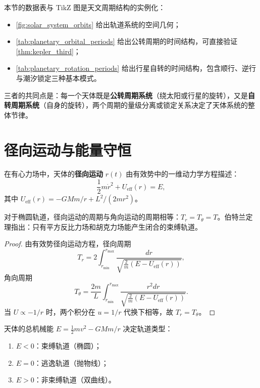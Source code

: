\begin{remark}[本节数据的组织方式]\label{rem:astro_data_organisation}
本节的数据表与 TikZ 图是天文周期结构的实例化：
\begin{itemize}
    \item \cref{fig:solar_system_orbits} 给出轨道系统的空间几何；
    \item \cref{tab:planetary_orbital_periods} 给出公转周期的时间结构，可直接验证 \cref{thm:kepler_third}；
    \item \cref{tab:planetary_rotation_periods} 给出行星自转的时间结构，包含顺行、逆行与潮汐锁定三种基本模式。
\end{itemize}
三者的共同点是：每一个天体既是\textbf{公转周期系统}（绕太阳或行星的旋转），又是\textbf{自转周期系统}（自身的旋转），两个周期的量级分离或锁定关系决定了天体系统的整体节律。
\end{remark}

\section{径向运动与能量守恒}

\begin{definition}[径向运动]\label{def:radial_motion}
在有心力场中，天体的\textbf{径向运动} \(r(t)\) 由有效势中的一维动力学方程描述：
\[
\frac12m\dot r^2+U_{\text{eff}}(r)=E,
\]
其中 \(U_{\text{eff}}(r)=-GMm/r+L^2/(2mr^2)\)。
\end{definition}

\begin{proposition}[径向振荡的周期]\label{prop:radial_oscillation_period}
对于椭圆轨道，径向运动的周期与角向运动的周期相等：\(T_r=T_\theta=T\)。伯特兰定理指出：只有平方反比力场和胡克力场能产生闭合的束缚轨道。
\end{proposition}

\begin{proof}
由有效势径向运动方程，径向周期
\[
T_r=2\int_{r_{\min}}^{r_{\max}}\frac{dr}{\sqrt{\frac2m(E-U_{\text{eff}}(r))}},
\]
角向周期
\[
T_\theta=\frac{2m}{L}\int_{r_{\min}}^{r_{\max}}\frac{r^2dr}{\sqrt{\frac2m(E-U_{\text{eff}}(r))}}.
\]
当 \(U\propto-1/r\) 时，两个积分在 \(u=1/r\) 代换下相等，故 \(T_r=T_\theta\)。
\end{proof}

\begin{proposition}[能量守恒与轨道类型]\label{prop:energy_orbital_type}
天体的总机械能 \(E=\frac12mv^2-GMm/r\) 决定轨道类型：
\begin{enumerate}[label=(\roman*)]
    \item \(E<0\)：束缚轨道（椭圆）；
    \item \(E=0\)：逃逸轨道（抛物线）；
    \item \(E>0\)：非束缚轨道（双曲线）。
\end{enumerate}
\end{proposition}

